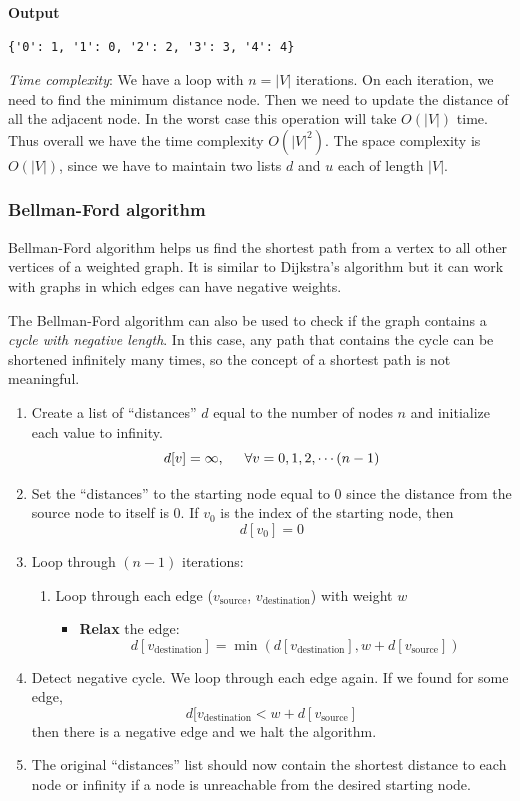 \documentclass[a4paper,11pt]{book}
\begin{document}
\textbf{Output}
\begin{lstlisting}
{'0': 1, '1': 0, '2': 2, '3': 3, '4': 4}
\end{lstlisting}
\noindent \textit{Time complexity}: We have a loop with $n=|V|$ iterations. On each iteration, we need to find the minimum distance node. Then we need to update the distance of all the adjacent node. In the worst case this operation will take $O(|V|)$ time. Thus overall we have the time complexity $O(|V|^2)$. The space complexity is $O(|V|)$, since we have to maintain two lists $d$ and $u$ each of length $|V|$.

\subsubsection{Bellman-Ford algorithm}
\vspace{4mm}

\noindent Bellman-Ford algorithm helps us find the shortest path from a vertex to all other vertices of a weighted graph. It is similar to Dijkstra's algorithm but it can work with graphs in which edges can have negative weights.
\vspace{4mm}

\noindent The Bellman-Ford algorithm can also be used to check if the graph
contains a \textit{cycle with negative length}. In this case, any path that contains the cycle can be shortened infinitely many times, so the concept of a shortest path is not meaningful.
\begin{enumerate}
    \item Create a list of ``distances'' $d$ equal to the number of nodes $n$ and initialize each value to infinity.
    $$d[v] = \infty, \hspace{5mm}\forall v = 0,1,2,\cdots (n-1)$$
    \item Set the ``distances'' to the starting node equal to 0 since the distance from the source node to itself is 0. If $v_0$ is the index of the starting node, then
    $$d[v_0] = 0$$
    \item Loop through $(n-1)$ iterations:
    \begin{enumerate}
        \item Loop through each edge ($v_{\text{source}}$, $v_{\text{destination}}$) with weight $w$
        \begin{itemize}
        	\item \textbf{Relax} the edge:
        	$$d[v_{\text{destination}}] = \min\left(d[v_{\text{destination}}], w + d[v_{\text{source}}]\right)$$
        \end{itemize}
    \end{enumerate}
    \item Detect negative cycle. We loop through each edge again. If we found for some edge, $$d[v_{\text{destination}} < w + d[v_{\text{source}}]$$ then there is a negative edge and we halt the algorithm.
    \item The original ``distances'' list should now contain the shortest distance to each node or infinity if a node is unreachable from the desired starting node.
\end{enumerate}
\end{document}
